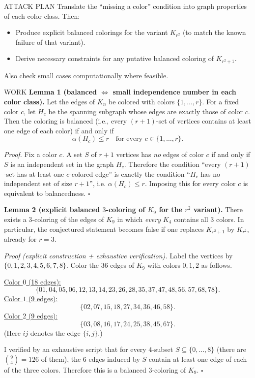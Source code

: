 ATTACK PLAN
Translate the ``missing a color'' condition into graph properties of each color
class.
Then:
\begin{itemize}
\item Produce explicit balanced colorings for the variant $K_{r^2}$ (to match the
known failure of that variant).
\item Derive necessary constraints for any putative balanced coloring of
$K_{r^2+1}$.
\end{itemize}
Also check small cases computationally where feasible.

WORK
\textbf{Lemma 1 (balanced $\Leftrightarrow$ small independence number in each color class).}
Let the edges of $K_n$ be colored with colors $\{1,\dots,r\}$.
For a fixed color $c$, let $H_c$ be the spanning subgraph whose edges are exactly
those of color $c$.
Then the coloring is balanced (i.e., every $(r+1)$-set of vertices contains at
least one edge of each color) if and only if
\[
\alpha(H_c)\le r\quad\text{for every }c\in\{1,\dots,r\}.
\]

\emph{Proof.}
Fix a color $c$.
A set $S$ of $r+1$ vertices has \emph{no} edges of color $c$ if and only if $S$ is
an independent set in the graph $H_c$.
Therefore the condition ``every $(r+1)$-set has at least one $c$-colored edge'' is
exactly the condition ``$H_c$ has no independent set of size $r+1$'', i.e.
$\alpha(H_c)\le r$.
Imposing this for every color $c$ is equivalent to balancedness.
\hfill $\square$

\medskip
\textbf{Lemma 2 (explicit balanced $3$-coloring of $K_9$ for the $r^2$ variant).}
There exists a $3$-coloring of the edges of $K_9$ in which \emph{every} $K_4$
contains all $3$ colors.
In particular, the conjectured statement becomes false if one replaces
$K_{r^2+1}$ by $K_{r^2}$, already for $r=3$.

\emph{Proof (explicit construction + exhaustive verification).}
Label the vertices by $\{0,1,2,3,4,5,6,7,8\}$.
Color the $36$ edges of $K_9$ with colors $0,1,2$ as follows.

\underline{Color $0$ (18 edges):}
\[
\{01,04,05,06,12,13,14,23,26,28,35,37,47,48,56,57,68,78\}.
\]
\underline{Color $1$ (9 edges):}
\[
\{02,07,15,18,27,34,36,46,58\}.
\]
\underline{Color $2$ (9 edges):}
\[
\{03,08,16,17,24,25,38,45,67\}.
\]
(Here $ij$ denotes the edge $\{i,j\}$.)

I verified by an exhaustive script that for every $4$-subset $S\subseteq\{0,\dots,8\}$
(there are ${9\choose 4}=126$ of them), the $6$ edges induced by $S$ contain at
least one edge of each of the three colors.
Therefore this is a balanced $3$-coloring of $K_9$.
\hfill $\square$

